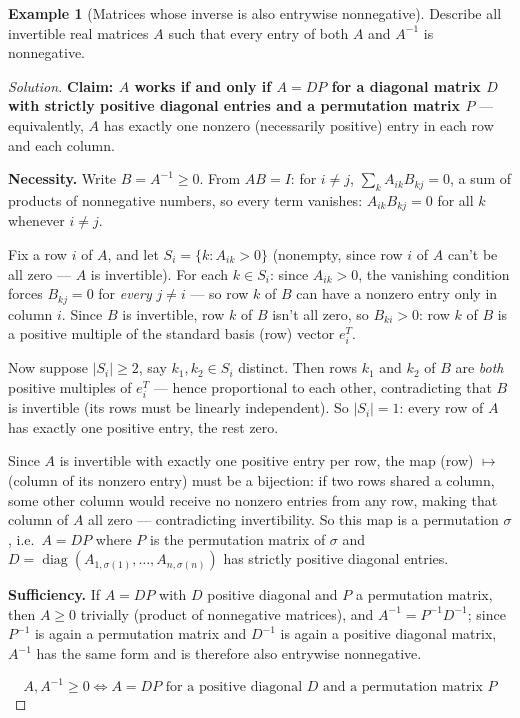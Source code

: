 \documentclass[11pt]{article}
\theoremstyle{definition}
\newtheorem{example}{Example}[section]
\newcommand{\diag}{\operatorname{diag}}
\begin{document}
\begin{example}[Matrices whose inverse is also entrywise nonnegative]
Describe all invertible real matrices $A$ such that every entry of both $A$ and $A^{-1}$ is nonnegative.
\end{example}
\begin{proof}[Solution]
\textbf{Claim: $A$ works if and only if $A=DP$ for a diagonal matrix $D$ with strictly positive diagonal entries and a permutation matrix $P$} — equivalently, $A$ has exactly one nonzero (necessarily positive) entry in each row and each column.

\textbf{Necessity.} Write $B=A^{-1}\ge0$. From $AB=I$: for $i\ne j$, $\sum_kA_{ik}B_{kj}=0$, a sum of products of nonnegative numbers, so every term vanishes: $A_{ik}B_{kj}=0$ for all $k$ whenever $i\ne j$.

Fix a row $i$ of $A$, and let $S_i=\{k:A_{ik}>0\}$ (nonempty, since row $i$ of $A$ can't be all zero — $A$ is invertible). For each $k\in S_i$: since $A_{ik}>0$, the vanishing condition forces $B_{kj}=0$ for \emph{every} $j\ne i$ — so row $k$ of $B$ can have a nonzero entry only in column $i$. Since $B$ is invertible, row $k$ of $B$ isn't all zero, so $B_{ki}>0$: row $k$ of $B$ is a positive multiple of the standard basis (row) vector $e_i^T$.

Now suppose $|S_i|\ge2$, say $k_1,k_2\in S_i$ distinct. Then rows $k_1$ and $k_2$ of $B$ are \emph{both} positive multiples of $e_i^T$ — hence proportional to each other, contradicting that $B$ is invertible (its rows must be linearly independent). So $|S_i|=1$: every row of $A$ has exactly one positive entry, the rest zero.

Since $A$ is invertible with exactly one positive entry per row, the map (row) $\mapsto$ (column of its nonzero entry) must be a bijection: if two rows shared a column, some other column would receive no nonzero entries from any row, making that column of $A$ all zero — contradicting invertibility. So this map is a permutation $\sigma$, i.e.\ $A=DP$ where $P$ is the permutation matrix of $\sigma$ and $D=\diag(A_{1,\sigma(1)},\dots,A_{n,\sigma(n)})$ has strictly positive diagonal entries.

\textbf{Sufficiency.} If $A=DP$ with $D$ positive diagonal and $P$ a permutation matrix, then $A\ge0$ trivially (product of nonnegative matrices), and $A^{-1}=P^{-1}D^{-1}$; since $P^{-1}$ is again a permutation matrix and $D^{-1}$ is again a positive diagonal matrix, $A^{-1}$ has the same form and is therefore also entrywise nonnegative.

\[
\boxed{A,A^{-1}\ge0\iff A=DP\text{ for a positive diagonal }D\text{ and a permutation matrix }P}
\]
\end{proof}
\end{document}
